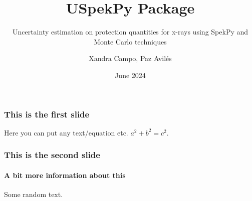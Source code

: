\documentclass{beamer}
\title{USpekPy Package}
\subtitle{Uncertainty estimation on protection quantities for x-rays using SpekPy and Monte Carlo techniques}
\author{Xandra Campo, Paz Avilés}
\institute{Ionizing Radiation Metrology Laboratory (LMRI) \newline CIEMAT, Spain}
\date{June 2024}
\begin{document}
	\maketitle
	\begin{frame}
		\frametitle{This is the first slide}
		Here you can put any text/equation etc. 
		$a^2 + b^2 = c^2$.		
	\end{frame}
	\begin{frame}
		\frametitle{This is the second slide}
		\framesubtitle{A bit more information about this}
		Some random text.		
	\end{frame}
\end{document}
